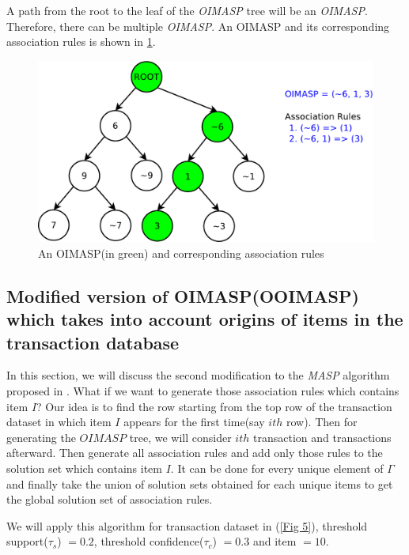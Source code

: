 \documentclass[review]{elsarticle}
\begin{document}
A path from the root to the leaf of the \emph{OIMASP} tree will be an \emph{OIMASP}. Therefore, there can be multiple \emph{OIMASP}. An OIMASP and its corresponding association rules is shown in \ref{Fig 7}.

\begin{figure}
\begin{center}
\includegraphics[scale=0.35]{pdf/oimasp}
\end{center}
\caption{An OIMASP(in green) and corresponding association rules}
\label{Fig 7}
\end{figure}

\subsection{Modified version of OIMASP(OOIMASP) which takes into account origins of items in the transaction database}
In this section, we will discuss the second modification to the \emph{MASP} algorithm proposed in \cite{oldmasp}. What if we want to generate those association rules which contains item $ I $? Our idea is to find the row starting from the top row of the transaction dataset in which item $ I $ appears for the first time(say $ ith $ row). Then for generating the $ OIMASP $ tree, we will consider $ ith $ transaction and transactions afterward. Then generate all association rules and add only those rules to the solution set which contains item $ I $. It can be done for every unique element of $ \Gamma $ and finally take the union of solution sets obtained for each unique items to get the global solution set of association rules.

We will apply this algorithm for transaction dataset in (\ref{Fig 5}), threshold support($ \tau _{s} $) $ = 0.2 $, threshold confidence($ \tau _{c} $) $ = 0.3 $ and item $ = 10 $.
\end{document}
